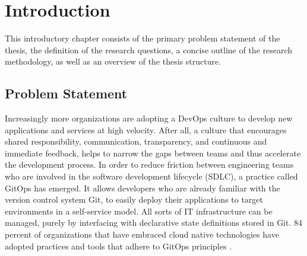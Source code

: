 
\chapter{Introduction}
\label{introduction}

This introductory chapter consists of the primary problem statement of the thesis,
the definition of the research questions,
a concise outline of the research methodology,
as well as
an overview of the thesis structure.

\section{Problem Statement}


Increasingly more organizations are adopting 
a DevOps culture
\autocite{devopsCultureSanchez2018characterizing}
to develop new applications and services at high velocity. 
After all, a culture that encourages
shared responsibility, communication, transparency,
and continuous and immediate feedback,
helps to narrow the gaps between teams and thus accelerate the development process.
In order to
reduce friction between engineering teams who are involved in the software development lifecycle (SDLC),
a practice called GitOps has emerged.
It allows developers who are already familiar with the version control system Git,
to easily deploy their applications to target environments in a self-service model.
All sorts of IT infrastructure can be managed, purely by
interfacing with declarative state definitions stored in Git.
%
84 percent of organizations that have embraced cloud native technologies
have adopted practices and tools that adhere to GitOps principles
\autocite{scalingGitOps2023weaveWorks}
\autocite{cncfAnnualSurvey2022}.




